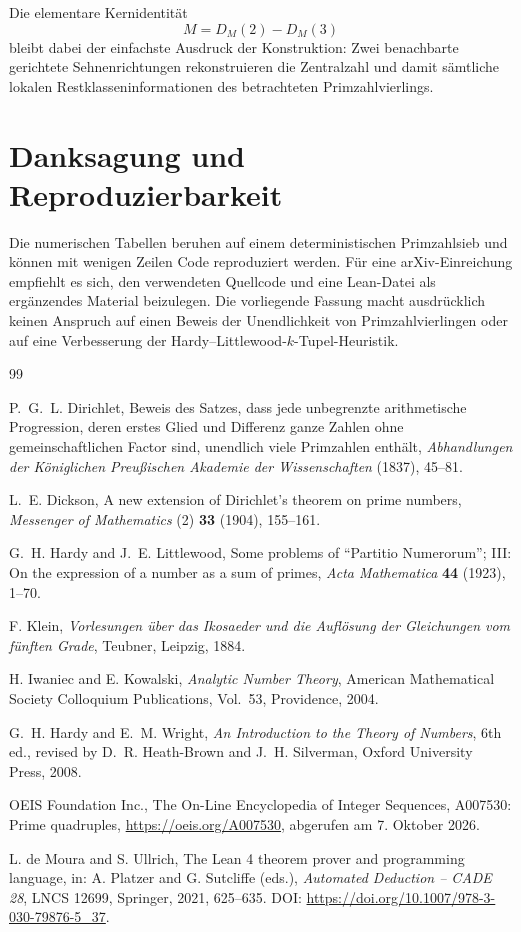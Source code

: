 \documentclass[11pt,a4paper]{article}
\theoremstyle{definition}
\theoremstyle{remark}
\begin{document}
Die elementare Kernidentität
\[
M=D_M(2)-D_M(3)
\]
bleibt dabei der einfachste Ausdruck der Konstruktion: Zwei benachbarte gerichtete Sehnenrichtungen rekonstruieren die Zentralzahl und damit sämtliche lokalen Restklasseninformationen des betrachteten Primzahlvierlings.

\section*{Danksagung und Reproduzierbarkeit}

Die numerischen Tabellen beruhen auf einem deterministischen Primzahlsieb und können mit wenigen Zeilen Code reproduziert werden. Für eine arXiv-Einreichung empfiehlt es sich, den verwendeten Quellcode und eine Lean-Datei als ergänzendes Material beizulegen. Die vorliegende Fassung macht ausdrücklich keinen Anspruch auf einen Beweis der Unendlichkeit von Primzahlvierlingen oder auf eine Verbesserung der Hardy--Littlewood-$k$-Tupel-Heuristik.

\begin{thebibliography}{99}

P.~G.~L. Dirichlet,
\newblock Beweis des Satzes, dass jede unbegrenzte arithmetische Progression, deren erstes Glied und Differenz ganze Zahlen ohne gemeinschaftlichen Factor sind, unendlich viele Primzahlen enthält,
\newblock \emph{Abhandlungen der Königlichen Preußischen Akademie der Wissenschaften} (1837), 45--81.

L.~E. Dickson,
\newblock A new extension of Dirichlet's theorem on prime numbers,
\newblock \emph{Messenger of Mathematics} (2) \textbf{33} (1904), 155--161.

G.~H. Hardy and J.~E. Littlewood,
\newblock Some problems of ``Partitio Numerorum''; III: On the expression of a number as a sum of primes,
\newblock \emph{Acta Mathematica} \textbf{44} (1923), 1--70.

F. Klein,
\newblock \emph{Vorlesungen über das Ikosaeder und die Auflösung der Gleichungen vom fünften Grade},
\newblock Teubner, Leipzig, 1884.

H. Iwaniec and E. Kowalski,
\newblock \emph{Analytic Number Theory},
\newblock American Mathematical Society Colloquium Publications, Vol.~53, Providence, 2004.

G.~H. Hardy and E.~M. Wright,
\newblock \emph{An Introduction to the Theory of Numbers}, 6th ed.,
\newblock revised by D.~R. Heath-Brown and J.~H. Silverman, Oxford University Press, 2008.

OEIS Foundation Inc.,
\newblock The On-Line Encyclopedia of Integer Sequences, A007530: Prime quadruples,
\newblock \url{https://oeis.org/A007530}, abgerufen am 7. Oktober 2026.

L. de Moura and S. Ullrich,
\newblock The Lean 4 theorem prover and programming language,
\newblock in: A. Platzer and G. Sutcliffe (eds.), \emph{Automated Deduction -- CADE 28}, LNCS 12699, Springer, 2021, 625--635.
\newblock DOI: \url{https://doi.org/10.1007/978-3-030-79876-5_37}.

\end{thebibliography}
\end{document}
